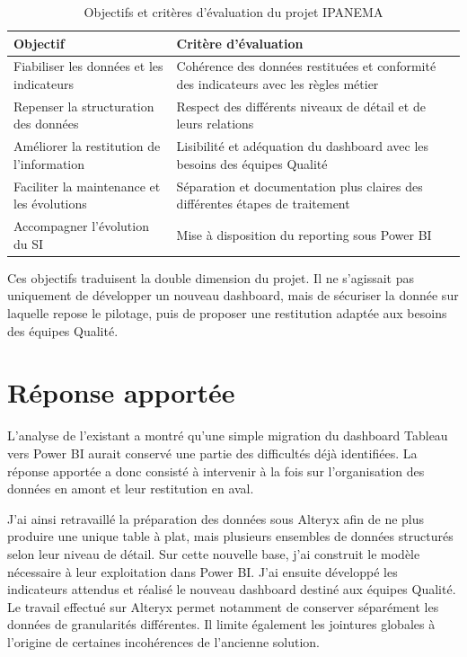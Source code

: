 \begin{table}[!ht]
\centering
\caption{Objectifs et critères d'évaluation du projet IPANEMA}
\label{tab:objectifs-criteres}
\vspace{6pt}
\renewcommand{\arraystretch}{1.5} %
\setlength{\tabcolsep}{10pt}     %
\begin{tabular}{|>{\raggedright\arraybackslash}p{5cm}|>{\raggedright\arraybackslash}p{8.5cm}|}
\hline
\textbf{Objectif} & \textbf{Critère d'évaluation} \\
\hline
Fiabiliser les données et les indicateurs & Cohérence des données restituées et conformité des indicateurs avec les règles métier \\
\hline
Repenser la structuration des données & Respect des différents niveaux de détail et de leurs relations \\
\hline
Améliorer la restitution de l'information & Lisibilité et adéquation du dashboard avec les besoins des équipes Qualité \\
\hline
Faciliter la maintenance et les évolutions & Séparation et documentation plus claires des différentes étapes de traitement \\
\hline
Accompagner l'évolution du SI & Mise à disposition du reporting sous Power BI \\
\hline
\end{tabular}
\end{table}

Ces objectifs traduisent la double dimension du projet. Il ne s'agissait pas uniquement 
de développer un nouveau dashboard, mais de sécuriser la donnée sur laquelle repose le 
pilotage, puis de proposer une restitution adaptée aux besoins des équipes Qualité. 

\section{Réponse apportée}
\label{sec121}
L'analyse de l'existant a montré qu'une simple migration du dashboard Tableau vers 
Power BI aurait conservé une partie des difficultés déjà identifiées. La réponse apportée a 
donc consisté à intervenir à la fois sur l'organisation des données en amont et leur restitution 
en aval. 

J'ai ainsi retravaillé la préparation des données sous Alteryx afin de ne plus produire 
une unique table à plat, mais plusieurs ensembles de données structurés selon leur niveau de 
détail. Sur cette nouvelle base, j'ai construit le modèle nécessaire à leur exploitation dans 
Power BI. J'ai ensuite développé les indicateurs attendus et réalisé le nouveau dashboard 
destiné aux équipes Qualité. Le travail effectué sur Alteryx permet notamment de conserver 
séparément les données de granularités différentes. Il limite également les jointures globales 
à l'origine de certaines incohérences de l'ancienne solution.

